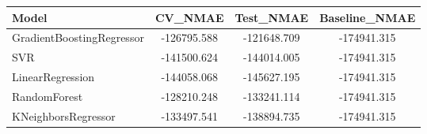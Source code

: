 \begin{tabular}{|l|c|c|c|}
\toprule
Model & CV\_NMAE & Test\_NMAE & Baseline\_NMAE \\
\midrule
GradientBoostingRegressor & -126795.588 & -121648.709 & -174941.315 \\
SVR & -141500.624 & -144014.005 & -174941.315 \\
LinearRegression & -144058.068 & -145627.195 & -174941.315 \\
RandomForest & -128210.248 & -133241.114 & -174941.315 \\
KNeighborsRegressor & -133497.541 & -138894.735 & -174941.315 \\
\bottomrule
\end{tabular}
